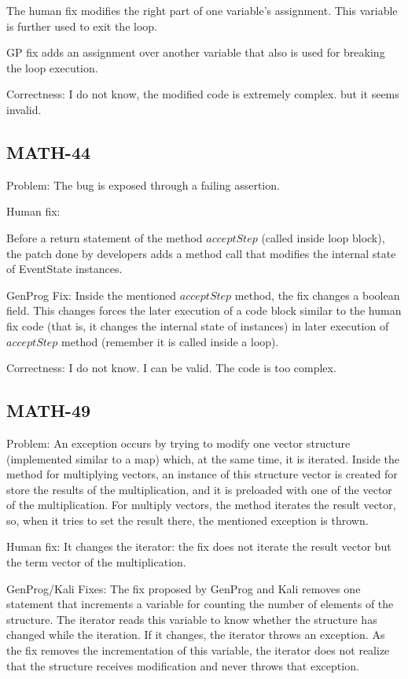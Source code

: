 \documentclass{article}
\begin{document}
The human fix modifies the right part of one variable's assignment. This variable is further used to exit the loop.

GP fix adds an assignment over another variable that also is used for breaking the loop execution.

Correctness: I do not know, the modified code is extremely complex. but it seems invalid.

\subsection{MATH-44}

Problem:
The bug is exposed through a failing assertion.

Human fix:

Before a return statement of the method $acceptStep$ (called inside loop block), 
the patch done by developers adds a method call that modifies the internal state of EventState instances.

GenProg Fix:
Inside the mentioned $acceptStep$ method, the fix changes a boolean field.
This changes forces the later execution of a code block similar to the human fix code (that is, it changes the internal state of instances) in later execution of $acceptStep$ method (remember it is called inside a loop).

Correctness: I do not know. I can be valid. The code is too complex.


\subsection{MATH-49}


Problem:
An exception occurs by trying to modify one vector structure (implemented similar to a map) which, at the same time, it is iterated.
Inside the method for multiplying vectors, an instance of this structure vector is created for store the results of the multiplication, and it is preloaded with one of the vector of the multiplication.
For multiply vectors, the method  iterates the result vector, so, when it tries to set the result there, the mentioned exception is thrown. 

Human fix:
It changes the iterator:  the fix does not iterate the result vector but the term vector of the  multiplication.

GenProg/Kali Fixes:
The fix proposed by GenProg and Kali removes one statement that increments a variable for counting the number of elements of the structure.
The iterator reads this variable to know whether the structure has changed while the iteration. If it changes, the iterator throws an exception.
As the fix removes the incrementation of this variable, the iterator does not realize that the structure receives modification and never throws that exception.
\end{document}
